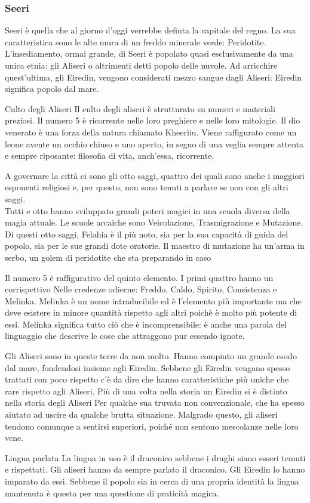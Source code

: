 \subsubsection{Seeri}
Seeri \`e quella che al giorno d'oggi verrebbe definta la capitale del regno.
La sua caratteristica sono le alte mura di un freddo minerale verde: Peridotite.
L'insediamento, ormai grande, di Seeri \`e popolato quasi esclusivamente da una unica etnia:
gli Aliseri o altrimenti detti popolo delle nuvole.
Ad arricchire quest'ultima, gli Eiredin, vengono considerati mezzo sangue
dagli Aliseri: Eiredin significa popolo dal mare.
\begin{commentbox}{Culto degli Aliseri}
  Il culto degli aliseri \`e strutturato su numeri e materiali preziosi. Il numero 5 \`e
  ricorrente nelle loro preghiere e nelle loro mitologie. Il dio venerato \`e una forza
  della natura chiamato Kheeriiu. Viene raffigurato come un leone avente un occhio chiuso
  e uno aperto, in segno di una veglia sempre attenta e sempre riposante: filosofia di vita,
  anch'essa, ricorrente.
\end{commentbox}
A governare la citt\`a ci sono gli otto saggi, quattro dei quali sono anche i maggiori esponenti
religiosi e, per questo, non sono tenuti a parlare se non con gli altri saggi.\\
Tutti e otto hanno sviluppato grandi poteri magici in una scuola diversa della magia attuale.
Le scuole arcaiche sono Veicolazione, Trasmigrazione e Mutazione.
Di questi otto saggi, Felahia \`e il pi\`u noto, sia per la sua capacit\`a di guida
del popolo, sia per le sue grandi dote oratorie.
Il maestro di mutazione ha un'arma in serbo, un golem di peridotite che sta preparando
in caso 
\begin{commentbox}{5}
  Il numero 5 \`e raffigurativo del quinto elemento. I primi quattro hanno un corrispettivo
  Nelle credenze odierne: Freddo, Caldo, Spirito, Consistenza e Melinka.
  Melinka \`e un nome intraducibile ed \`e l'elemento pi\`u importante ma che deve esistere
  in minore quantit\`a rispetto agli altri poich\`e \`e molto pi\`u potente di essi.
  Melinka significa tutto ci\`o che \`e incomprensibile: \`e anche una parola del
  linguaggio che descrive le cose che attraggono pur essendo ignote.
\end{commentbox}
Gli Aliseri sono in queste terre da non molto. Hanno compiuto un grande esodo dal mare,
fondendosi insieme agli Eiredin. Sebbene gli Eiredin vengano spesso trattati con poco
rispetto c'\`e da dire che hanno caratteristiche pi\`u uniche che rare rispetto agli Aliseri.
Pi\`u di una volta nella storia un Eiredin si \`e distinto nella storia degli Aliseri
Per qualche sua truvata non convenzionale, che ha spesso aiutato ad uscire da qualche
brutta situazione. Malgrado questo, gli aliseri tendono comunque a sentirsi superiori, poich\'e
non sentono mescolanze nelle loro vene.
\begin{commentbox}{Lingua parlata}
  La lingua in uso \`e il draconico sebbene i draghi siano esseri temuti e rispettati.
  Gli aliseri hanno da sempre parlato il draconico. Gli Eiredin lo hanno imparato da essi.
  Sebbene il popolo sia in cerca di una propria identit\`a la lingua mantenuta \`e questa
  per una questione di praticit\`a magica.
\end{commentbox}